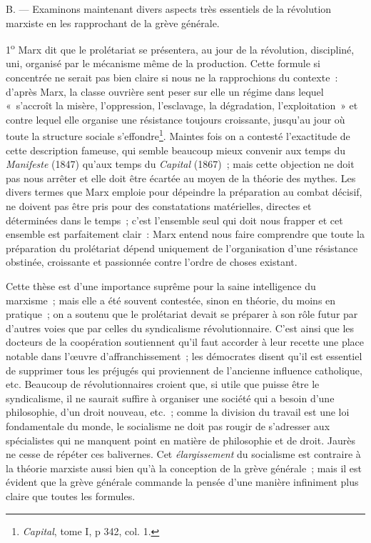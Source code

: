 \documentclass[french,twoside]{book} %
\begin{document}
\noindent B. — Examinons maintenant divers aspects très essentiels de la révolution marxiste en les rapprochant de la grève générale.\par
1\textsuperscript{o} Marx dit que le prolétariat se présentera, au jour de la révolution, discipliné, uni, organisé par le mécanisme même de la production. Cette formule si concentrée ne serait pas bien claire si nous ne la rapprochions du  contexte : d’après Marx, la classe ouvrière sent peser sur elle un régime dans lequel « s’accroît la misère, l’oppression, l’esclavage, la dégradation, l’exploitation » et contre lequel elle organise une résistance toujours croissante, jusqu’au jour où toute la structure sociale s’effondre\footnote{ \noindent \emph{Capital}, tome I, p 342, col. 1.
 }. Maintes fois on a contesté l’exactitude de cette description fameuse, qui semble beaucoup mieux convenir aux temps du \emph{Manifeste} (1847) qu’aux temps du \emph{Capital} (1867) ; mais cette objection ne doit pas nous arrêter et elle doit être écartée au moyen de la théorie des mythes. Les divers termes que Marx emploie pour dépeindre la préparation au combat décisif, ne doivent pas être pris pour des constatations matérielles, directes et déterminées dans le temps ; c’est l’ensemble seul qui doit nous frapper et cet ensemble est parfaitement clair : Marx entend nous faire comprendre que toute la préparation du prolétariat dépend uniquement de l’organisation d’une résistance obstinée, croissante et passionnée contre l’ordre de choses existant.\par
Cette thèse est d’une importance suprême pour la saine intelligence du marxisme ; mais elle a été souvent contestée, sinon en théorie, du moins en pratique ; on a soutenu que le prolétariat devait se préparer à son rôle futur par d’autres voies que par celles du syndicalisme révolutionnaire. C’est ainsi que les docteurs de la coopération soutiennent qu’il faut accorder à leur recette une place notable dans l’œuvre d’affranchissement ; les démocrates disent qu’il est essentiel de supprimer tous les préjugés  qui proviennent de l’ancienne influence catholique, etc. Beaucoup de révolutionnaires croient que, si utile que puisse être le syndicalisme, il ne saurait suffire à organiser une société qui a besoin d’une philosophie, d’un droit nouveau, etc. ; comme la division du travail est une loi fondamentale du monde, le socialisme ne doit pas rougir de s’adresser aux spécialistes qui ne manquent point en matière de philosophie et de droit. Jaurès ne cesse de répéter ces balivernes. Cet \emph{élargissement} du socialisme est contraire à la théorie marxiste aussi bien qu’à la conception de la grève générale ; mais il est évident que la grève générale commande la pensée d’une manière infiniment plus claire que toutes les formules.\par
\end{document}
